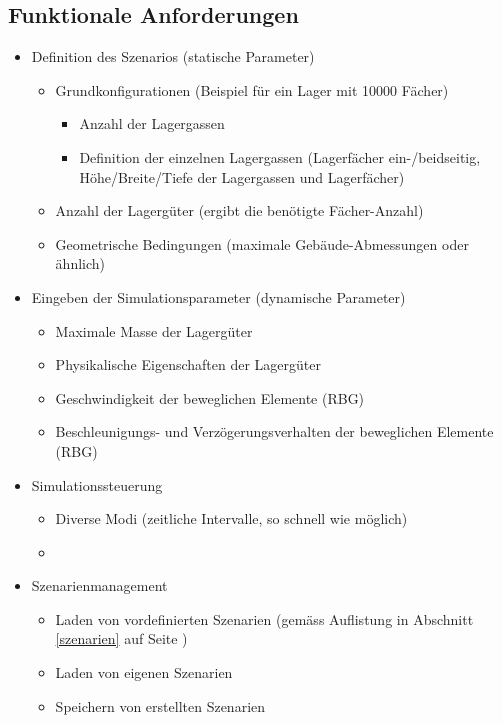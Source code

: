 \documentclass[11pt,a4paper]{article}
\begin{document}
\subsection{Funktionale Anforderungen}
\begin{itemize}
  \item Definition des Szenarios (statische Parameter)
  \begin{itemize}
    \item Grundkonfigurationen (Beispiel für ein Lager mit 10000 Fächer)
    \begin{itemize}
      \item Anzahl der Lagergassen
      \item Definition der einzelnen Lagergassen (Lagerfächer ein-/beidseitig, Höhe/Breite/Tiefe der Lagergassen und Lagerfächer)
    \end{itemize}
    
    \item Anzahl der Lagergüter (ergibt die benötigte Fächer-Anzahl)
    \item Geometrische Bedingungen (maximale Gebäude-Abmessungen oder ähnlich)
  \end{itemize}
  
  \item Eingeben der Simulationsparameter (dynamische Parameter)
    \begin{itemize}
    \item Maximale Masse der Lagergüter
    \item Physikalische Eigenschaften der Lagergüter
    \item Geschwindigkeit der beweglichen Elemente (RBG)
    \item Beschleunigungs- und Verzögerungsverhalten der beweglichen Elemente (RBG)
  \end{itemize}
  \item Simulationssteuerung
    \begin{itemize}
    \item Diverse Modi (zeitliche Intervalle, so schnell wie möglich)
    \item 
  \end{itemize}
  \item Szenarienmanagement
    \begin{itemize}
    \item Laden von vordefinierten Szenarien (gemäss Auflistung in Abschnitt \ref{szenarien} auf Seite \pageref{szenarien})
    \item Laden von eigenen Szenarien
    \item Speichern von erstellten Szenarien
  \end{itemize}
\end{itemize}
%
\end{document}
